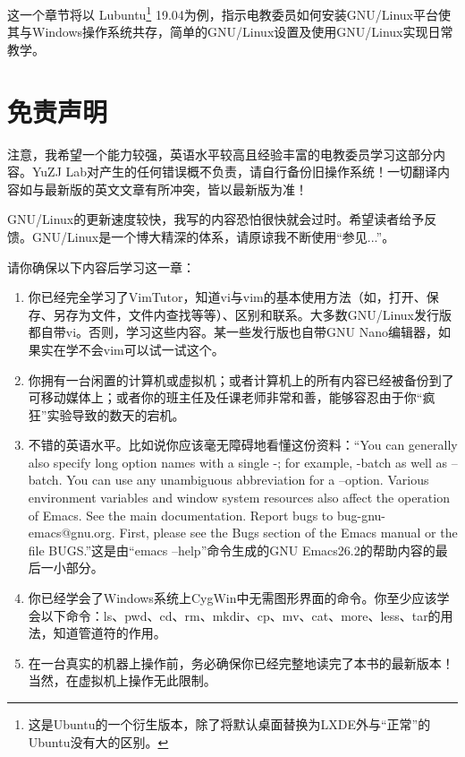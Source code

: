 这一个章节将以 Lubuntu\footnote{这是Ubuntu的一个衍生版本，除了将默认桌面替换为LXDE外与“正常”的Ubuntu没有大的区别。} 19.04为例，指示电教委员如何安装GNU/Linux平台使其与Windows操作系统共存，简单的GNU/Linux设置及使用GNU/Linux实现日常教学。\par
\section{免责声明}
{\color{red} {注意，我希望一个能力较强，英语水平较高且经验丰富的电教委员学习这部分内容。YuZJ Lab对产生的任何错误概不负责，请自行备份旧操作系统！一切翻译内容如与最新版的英文文章有所冲突，皆以最新版为准！}}\par
GNU/Linux的更新速度较快，我写的内容恐怕很快就会过时。希望读者给予反馈。GNU/Linux是一个博大精深的体系，请原谅我不断使用“参见...”。\par
请你确保以下内容后学习这一章：
\begin{enumerate}
	\item 你已经完全学习了VimTutor，知道vi与vim的基本使用方法（如，打开、保存、另存为文件，文件内查找等等）、区别和联系。大多数GNU/Linux发行版都自带vi。否则，学习这些内容。某一些发行版也自带GNU Nano编辑器，如果实在学不会vim可以试一试这个。
	\item 你拥有一台闲置的计算机或虚拟机；或者计算机上的所有内容已经被备份到了可移动媒体上；或者你的班主任及任课老师非常和善，能够容忍由于你“疯狂”实验导致的数天的宕机。
	\item 不错的英语水平。比如说你应该毫无障碍地看懂这份资料：“You can generally also specify long option names with a single -; for example, -batch as well as --batch.  You can use any unambiguous abbreviation for a --option. Various environment variables and window system resources also affect the operation of Emacs.  See the main documentation. Report bugs to bug-gnu-emacs@gnu.org.  First, please see the Bugs section of the Emacs manual or the file BUGS.”这是由“emacs --help”命令生成的GNU Emacs26.2的帮助内容的最后一小部分。
	\item 你已经学会了Windows系统上CygWin中无需图形界面的命令。你至少应该学会以下命令：ls、pwd、cd、rm、mkdir、cp、mv、cat、more、less、tar的用法，知道管道符的作用。
	\item 在一台真实的机器上操作前，务必确保你已经完整地读完了本书的最新版本！当然，在虚拟机上操作无此限制。
\end{enumerate}
